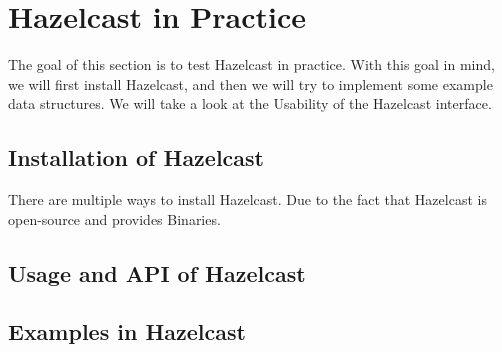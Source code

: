 
\section{Hazelcast in Practice}
The goal of this section is to test Hazelcast in practice. With this goal in
mind, we will first install Hazelcast, and then we will try to implement some
example data structures. We will take a look at the Usability of the Hazelcast
interface.
\todo{}
\subsection{Installation of Hazelcast}
There are multiple ways to install Hazelcast. Due to the fact that Hazelcast is
open-source and provides Binaries. 
\todo{}
\subsection{Usage and API of Hazelcast}
\todo{}
\subsection{Examples in Hazelcast}
\todo{}